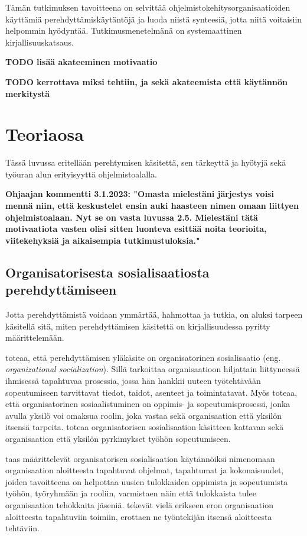 \documentclass[utf8]{gradu3}
\begin{document}
Tämän tutkimuksen tavoitteena on selvittää ohjelmistokehitysorganisaatioiden käyttämiä perehdyttämiskäytäntöjä ja luoda niistä synteesiä, jotta niitä voitaisiin helpommin hyödyntää. Tutkimusmenetelmänä on systemaattinen kirjallisuuskatsaus.

\textbf{TODO lisää akateeminen motivaatio}

\textbf{TODO kerrottava miksi tehtiin, ja sekä akateemista että käytännön merkitystä}

\chapter{Teoriaosa}

Tässä luvussa eritellään perehtymisen käsitettä, sen tärkeyttä ja hyötyjä sekä työuran alun erityisyyttä ohjelmistoalalla.

\textbf{Ohjaajan kommentti 3.1.2023: "Omasta mielestäni järjestys voisi mennä niin, että keskustelet ensin auki haasteen nimen omaan liittyen ohjelmistoalaan. Nyt se on vasta luvussa 2.5. Mielestäni tätä motivaatiota vasten olisi sitten luonteva esittää noita teorioita, viitekehyksiä ja aikaisempia tutkimustuloksia."}

\section{Organisatorisesta sosialisaatiosta perehdyttämiseen}
Jotta perehdyttämistä voidaan ymmärtää, hahmottaa ja tutkia, on aluksi tarpeen käsitellä sitä, miten perehdyttämisen käsitettä on kirjallisuudessa pyritty määrittelemään.

\textcite{wanberg-2012} toteaa, että perehdyttämisen yläkäsite on organisatorinen sosialisaatio (eng. \textit{organizational socialization}). Sillä \textcite{wanberg-2012} tarkoittaa organisaatioon hiljattain liittyneessä ihmisessä tapahtuvaa prosessia, jossa hän hankkii uuteen työtehtävään sopeutumiseen tarvittavat tiedot, taidot, asenteet ja toimintatavat. Myös \textcite{chao-2012} toteaa, että organisatorinen sosiaalistuminen on oppimis- ja sopeutumisprosessi, jonka avulla yksilö voi omaksua roolin, joka vastaa sekä organisaation että yksilön itsensä tarpeita. \textcite{chao-2012} toteaa organisatorisen sosialisaation käsitteen kattavan sekä organisaation että yksilön pyrkimykset työhön sopeutumiseen.

\textcite{saks-gruman-2012} taas määrittelevät organisatorisen sosialisaation käytännöiksi nimenomaan organisaation aloitteesta tapahtuvat ohjelmat, tapahtumat ja kokonaisuudet, joiden tavoitteena on helpottaa uusien tulokkaiden oppimista ja sopeutumista työhön, työryhmään ja rooliin, varmistaen näin että tulokkaista tulee organisaation tehokkaita jäseniä. \textcite{saks-gruman-2012} tekevät vielä erikseen eron organisaation aloitteesta tapahtuviin toimiin, erottaen ne työntekijän itsensä aloitteesta tehtäviin.
\end{document}

